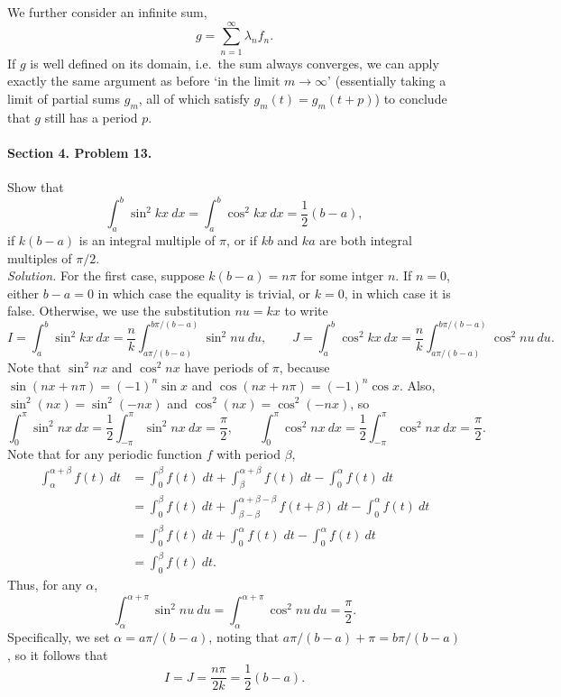 \documentclass[10pt]{article}
\begin{document}
        We further consider an infinite sum,
        \[
                g = \sum_{n = 1}^\infty \lambda_nf_n.
        \]
        If $g$ is well defined on its domain, i.e.\ the sum always converges, we can apply exactly the same argument as before 
        `in the limit $m \to \infty$' (essentially taking a limit of partial sums $g_m$, all of which satisfy $g_m(t) = g_m(t + p)$)
        to conclude that $g$ still has a period $p$.

        \paragraph{Section 4. Problem 13.} Show that
        \[
                \int_a^b \sin^2{kx}\: dx = \int_a^b \cos^2{kx}\: dx = \frac{1}{2}(b - a),
        \]
        if $k(b - a)$ is an integral multiple of $\pi$, or if $kb$ and $ka$ are both integral multiples of $\pi /2$. \\

        \textit{Solution.} For the first case, suppose $k(b - a) = n\pi$ for some intger $n$.
        If $n = 0$, either $b - a = 0$ in which case the equality is trivial, or $k = 0$, in which case it is false.
        Otherwise, we use the substitution $nu = kx$ to write
        \[
                I = \int_a^b \sin^2{kx}\: dx = \frac{n}{k}\int_{a\pi/(b-a)}^{b\pi/(b-a)} \sin^2{nu}\: du, \qquad
                J = \int_a^b \cos^2{kx}\: dx = \frac{n}{k}\int_{a\pi/(b-a)}^{b\pi/(b-a)} \cos^2{nu}\: du.
        \]
        Note that $\sin^2{nx}$ and $\cos^2{nx}$ have periods of $\pi$, because $\sin(nx + n\pi) = (-1)^n\sin{x}$ and $\cos(nx + n\pi) = (-1)^n\cos{x}$.
        Also, $\sin^2(nx) = \sin^2(-nx)$ and $\cos^2(nx) = \cos^2(-nx)$, so
        \[
                \int_0^{\pi}\sin^2{nx}\:dx = \frac{1}{2}\int_{-\pi}^{\pi} \sin^2{nx}\:dx = \frac{\pi}{2}, \qquad
                \int_0^{\pi}\cos^2{nx}\:dx = \frac{1}{2}\int_{-\pi}^{\pi} \cos^2{nx}\:dx = \frac{\pi}{2}.
        \]
        Note that for any periodic function $f$ with period $\beta$,
        \begin{align*}
                \int_\alpha^{\alpha + \beta} f(t)\:dt
                        &= \int_{0}^{\beta}f(t)\;dt + \int_{\beta}^{\alpha + \beta}f(t)\;dt - \int_{0}^{\alpha}f(t)\;dt \\
                        &= \int_0^\beta f(t)\:dt + \int_{\beta - \beta}^{\alpha + \beta - \beta} f(t + \beta)\:dt - \int_{0}^{\alpha} f(t)\:dt \\
                        &= \int_0^\beta f(t)\:dt + \int_0^\alpha f(t)\;dt - \int_0^\alpha f(t)\:dt \\
                        &= \int_0^\beta f(t)\:dt.
        \end{align*}    
        Thus, for any $\alpha$,
        \[
                \int_\alpha^{\alpha + \pi} \sin^2{nu}\:du = \int_\alpha^{\alpha + \pi} \cos^2{nu}\:du = \frac{\pi}{2}.
        \]
        Specifically, we set $\alpha = a\pi/(b-a)$, noting that $a\pi/(b-a) + \pi = b\pi/(b-a)$, so it follows that
        \[
                I = J = \frac{n\pi}{2k} = \frac{1}{2}(b - a).\tag*{\qed}
        \]\\ 
\end{document}
